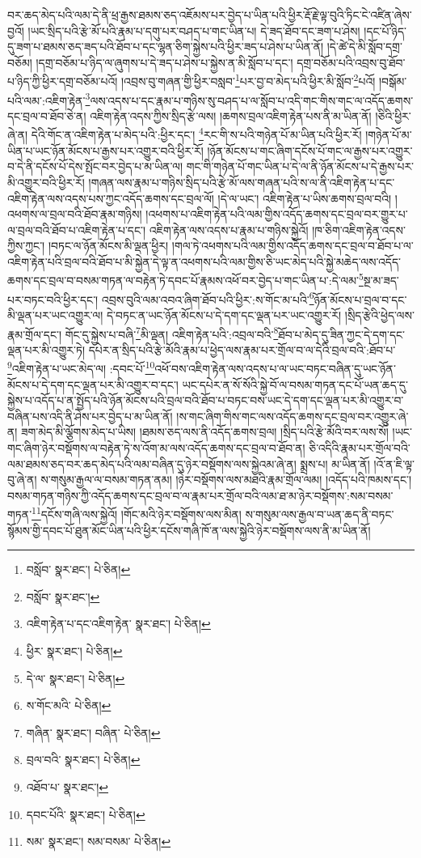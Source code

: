 བར་ཆད་མེད་པའི་ལམ་དེ་ནི་ཕྲ་རྒྱས་ཐམས་ཅད་འཇོམས་པར་བྱེད་པ་ཡིན་པའི་ཕྱིར་རྡོ་རྗེ་ལྟ་བུའི་ཏིང་ངེ་འཛིན་ཞེས་བྱའོ། །ཡང་སྲིད་པའི་རྩེ་མོ་པའི་རྣམ་པ་དགུ་པར་བཤད་པ་གང་ཡིན་པ། དེ་ཟད་ཐོབ་དང་ཟག་པ་ཤེས། །དང་པོ་ཉིད་དུ་ཟག་པ་ཐམས་ཅད་ཟད་པའི་ཐོབ་པ་དང་ལྷན་ཅིག་སྐྱེས་པའི་ཕྱིར་ཟད་པ་ཤེས་པ་ཡིན་ནོ། །དེ་ཚེ་དེ་མི་སློབ་དགྲ་བཅོམ། །དགྲ་བཅོམ་པ་ཉིད་ལ་ཞུགས་པ་དེ་ཟད་པ་ཤེས་པ་སྐྱེས་ན་མི་སློབ་པ་དང་། དགྲ་བཅོམ་པའི་འབྲས་བུ་ཐོབ་པ་ཉིད་ཀྱི་ཕྱིར་དགྲ་བཅོམ་པའོ། །འབྲས་བུ་གཞན་གྱི་ཕྱིར་བསླབ་\footnote{བསློབ་  སྣར་ཐང་།  པེ་ཅིན། }པར་བྱ་བ་མེད་པའི་ཕྱིར་མི་སློབ་\footnote{བསློབ་  སྣར་ཐང་། }པའོ། །བསྒོམ་པའི་ལམ་:འཇིག་རྟེན་\footnote{འཇིག་རྟེན་པ་དང་འཇིག་རྟེན་  སྣར་ཐང་།  པེ་ཅིན། }ལས་འདས་པ་དང་རྣམ་པ་གཉིས་སུ་བཤད་པ་ལ་སློབ་པ་འདི་གང་གིས་གང་ལ་འདོད་ཆགས་དང་བྲལ་བ་ཐོབ་ཅེ་ན། འཇིག་རྟེན་འདས་ཀྱིས་སྲིད་རྩེ་ལས། །ཆགས་བྲལ་འཇིག་རྟེན་པས་ནི་མ་ཡིན་ནོ། །ཅིའི་ཕྱིར་ཞེ་ན། དེའི་གོང་ན་འཇིག་རྟེན་པ་མེད་པའི་:ཕྱིར་དང་། \footnote{ཕྱིར་  སྣར་ཐང་།  པེ་ཅིན། }རང་གི་ས་པའི་གཉེན་པོ་མ་ཡིན་པའི་ཕྱིར་རོ། །གཉེན་པོ་མ་ཡིན་པ་ཡང་ཉོན་མོངས་པ་རྒྱས་པར་འགྱུར་བའི་ཕྱིར་རོ། །ཉོན་མོངས་པ་གང་ཞིག་དངོས་པོ་གང་ལ་རྒྱས་པར་འགྱུར་བ་དེ་ནི་དངོས་པོ་དེས་སྤོང་བར་བྱེད་པ་མ་ཡིན་ལ། གང་གི་གཉེན་པོ་གང་ཡིན་པ་དེ་ལ་ནི་ཉོན་མོངས་པ་དེ་རྒྱས་པར་མི་འགྱུར་བའི་ཕྱིར་རོ། །གཞན་ལས་རྣམ་པ་གཉིས་སྲིད་པའི་རྩེ་མོ་ལས་གཞན་པའི་ས་ལ་ནི་འཇིག་རྟེན་པ་དང་འཇིག་རྟེན་ལས་འདས་པས་ཀྱང་འདོད་ཆགས་དང་བྲལ་ལོ། །དེ་ལ་ཡང་། འཇིག་རྟེན་པ་ཡིས་ཆགས་བྲལ་བའི། །འཕགས་ལ་བྲལ་བའི་ཐོབ་རྣམ་གཉིས། །འཕགས་པ་འཇིག་རྟེན་པའི་ལམ་གྱིས་འདོད་ཆགས་དང་བྲལ་བར་གྱུར་པ་ལ་བྲལ་བའི་ཐོབ་པ་འཇིག་རྟེན་པ་དང་། འཇིག་རྟེན་ལས་འདས་པ་རྣམ་པ་གཉིས་སྐྱེའོ། །ཁ་ཅིག་འཇིག་རྟེན་འདས་ཀྱིས་ཀྱང་། །བཏང་ལ་ཉོན་མོངས་མི་ལྡན་ཕྱིར། །གལ་ཏེ་འཕགས་པའི་ལམ་གྱིས་འདོད་ཆགས་དང་བྲལ་བ་ཐོབ་པ་ལ་འཇིག་རྟེན་པའི་བྲལ་བའི་ཐོབ་པ་མི་སྐྱེན་དེ་ལྟ་ན་འཕགས་པའི་ལམ་གྱིས་ཅི་ཡང་མེད་པའི་སྐྱེ་མཆེད་ལས་འདོད་ཆགས་དང་བྲལ་བ་བསམ་གཏན་ལ་བརྟེན་ཏེ་དབང་པོ་རྣམས་འཕོ་བར་བྱེད་པ་གང་ཡིན་པ་:དེ་ལམ་\footnote{དེ་ལ་  སྣར་ཐང་།  པེ་ཅིན། }སྔ་མ་ཟད་པར་བཏང་བའི་ཕྱིར་དང་། འབྲས་བུའི་ལམ་འབའ་ཞིག་ཐོབ་པའི་ཕྱིར་:ས་གོང་མ་པའི་\footnote{ས་གོང་མའི་  པེ་ཅིན། }ཉོན་མོངས་པ་བྲལ་བ་དང་མི་ལྡན་པར་ཡང་འགྱུར་ལ། དེ་བཏང་ན་ཡང་ཉོན་མོངས་པ་དེ་དག་དང་ལྡན་པར་ཡང་འགྱུར་རོ། །སྲིད་རྩེའི་ཕྱེད་ལས་རྣམ་གྲོལ་དང་། གོང་དུ་སྐྱེས་པ་བཞི་\footnote{གཞིན་  སྣར་ཐང་། བཞིན་  པེ་ཅིན། }མི་ལྡན། འཇིག་རྟེན་པའི་:འབྲལ་བའི་\footnote{བྲལ་བའི་  སྣར་ཐང་།  པེ་ཅིན། }ཐོབ་པ་མེད་དུ་ཟིན་ཀྱང་དེ་དག་དང་ལྡན་པར་མི་འགྱུར་ཏེ། དཔེར་ན་སྲིད་པའི་རྩེ་མོའི་རྣམ་པ་ཕྱེད་ལས་རྣམ་པར་གྲོལ་བ་ལ་དེའི་བྲལ་བའི་:ཐོབ་པ་\footnote{འཐོབ་པ་  སྣར་ཐང་། }འཇིག་རྟེན་པ་ཡང་མེད་ལ། :དབང་པོ་\footnote{དབང་པོའི་  སྣར་ཐང་།  པེ་ཅིན། }འཕོ་བས་འཇིག་རྟེན་ལས་འདས་པ་ལ་ཡང་བཏང་བཞིན་དུ་ཡང་ཉོན་མོངས་པ་དེ་དག་དང་ལྡན་པར་མི་འགྱུར་བ་དང་། ཡང་དཔེར་ན་སོ་སོའི་སྐྱེ་བོ་ལ་བསམ་གཏན་དང་པོ་ཡན་ཆད་དུ་སྐྱེས་པ་འདོད་པ་ན་སྤྱོད་པའི་ཉོན་མོངས་པའི་བྲལ་བའི་ཐོབ་པ་བཏང་བས་ཡང་དེ་དག་དང་ལྡན་པར་མི་འགྱུར་བ་བཞིན་པས་འདི་ནི་ཤེས་པར་བྱེད་པ་མ་ཡིན་ནོ། །ས་གང་ཞིག་གིས་གང་ལས་འདོད་ཆགས་དང་བྲལ་བར་འགྱུར་ཞེ་ན། ཟག་མེད་མི་ལྕོགས་མེད་པ་ཡིས། །ཐམས་ཅད་ལས་ནི་འདོད་ཆགས་བྲལ། །སྲིད་པའི་རྩེ་མོའི་བར་ལས་སོ། །ཡང་གང་ཞིག་ཉེར་བསྡོགས་ལ་བརྟེན་ཏེ་ས་འོག་མ་ལས་འདོད་ཆགས་དང་བྲལ་བ་ཐོབ་ན། ཅི་འདིའི་རྣམ་པར་གྲོལ་བའི་ལམ་ཐམས་ཅད་བར་ཆད་མེད་པའི་ལམ་བཞིན་དུ་ཉེར་བསྡོགས་ལས་སྐྱེའམ་ཞེ་ན། སྨྲས་པ། མ་ཡིན་ནོ། །འོ་ན་ཇི་ལྟ་བུ་ཞེ་ན། ས་གསུམ་རྒྱལ་ལ་བསམ་གཏན་ནམ། །ཉེར་བསྡོགས་ལས་མཐའི་རྣམ་གྲོལ་ལམ། །འདོད་པའི་ཁམས་དང་། བསམ་གཏན་གཉིས་ཀྱི་འདོད་ཆགས་དང་བྲལ་བ་ལ་རྣམ་པར་གྲོལ་བའི་ལམ་ཐ་མ་ཉེར་བསྡོགས་:སམ་བསམ་གཏན་\footnote{སམ་  སྣར་ཐང་། སམ་བསམ་  པེ་ཅིན། }དངོས་གཞི་ལས་སྐྱེའོ། །གོང་མའི་ཉེར་བསྡོགས་ལས་མིན། ས་གསུམ་ལས་རྒྱལ་བ་ཡན་ཆད་ནི་བཏང་སྙོམས་གྱི་དབང་པོ་ཐུན་མོང་ཡིན་པའི་ཕྱིར་དངོས་གཞི་ཁོ་ན་ལས་སྐྱེའི་ཉེར་བསྡོགས་ལས་ནི་མ་ཡིན་ནོ། 